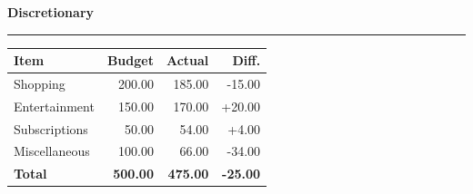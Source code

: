 \documentclass[11pt]{article}
\begin{document}
\begin{minipage}[t]{0.48\textwidth}
  {\large\textbf{\color{accent}Discretionary}} \par
  \vspace{0.2em}
  {\color{accent!30}\rule{\linewidth}{1.2pt}} \par
  \vspace{0.4em}
  \begin{tabularx}{\linewidth}{X r r r}
    \textbf{Item} & \textbf{Budget} & \textbf{Actual} & \textbf{Diff.} \\
    \midrule
    Shopping & 200.00 & 185.00 & -15.00 \\
    Entertainment & 150.00 & 170.00 & +20.00 \\
    Subscriptions & 50.00 & 54.00 & +4.00 \\
    Miscellaneous & 100.00 & 66.00 & -34.00 \\
    \midrule
    \textbf{Total} & \textbf{500.00} & \textbf{475.00} & \textbf{-25.00} \\
  \end{tabularx}

\end{minipage}
\end{document}
